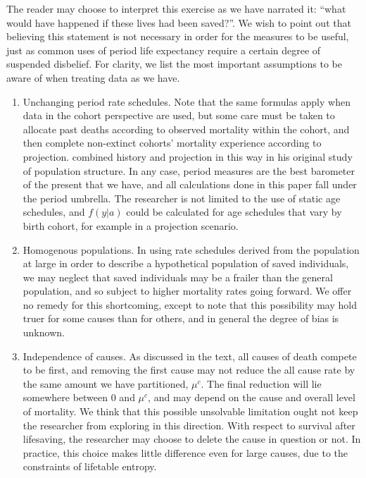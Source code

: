 \documentclass{article}
\begin{document}
The reader may choose to interpret this exercise as we
have narrated it: ``what would have happened if these lives had been saved?''. We wish to point out that believing
this statement is not necessary in order for the measures to be useful, just as common uses of
period life expectancy require a certain degree of suspended disbelief. For
clarity, we list the most important assumptions to be aware of when treating
data as we have.
\begin{enumerate}
\item Unchanging period rate schedules. Note that the same formulas apply when
data in the cohort perspective are used, but some care must be taken to allocate past deaths according to observed mortality within the cohort, and then complete non-extinct
cohorts' mortality experience according to
projection. \citet{brouard1986structure} combined history and projection
in this way in his original study of population structure.  In any case, period measures are the best barometer of the
present that we have, and all calculations done in this paper fall under the
period umbrella. The researcher is not limited to the use of static age
schedules, and $f(y|a)$ could be calculated for age schedules that vary
by birth cohort, for example in a projection scenario.
\item Homogenous populations. In using rate schedules derived from the
population at large in order to describe a hypothetical population of saved
individuals, we may neglect that saved individuals may be a frailer than the
general population, and so subject to higher mortality rates going forward. We
offer no remedy for this shortcoming, except to note that this possibility may
hold truer for some causes than for others, and in general the degree of bias is
unknown.
\item Independence of causes. As discussed in the text, all causes of death
compete to be first, and removing the first cause may not reduce the all cause
rate by the same amount we have partitioned, $\mu^c$. The final reduction will
lie somewhere between 0 and $\mu^c$, and may depend on the cause and
overall level of mortality. We think that this possible unsolvable limitation
ought not keep the researcher from exploring in this direction. With respect to
survival after lifesaving, the researcher may choose to delete the cause in
question or not. In practice, this choice makes little difference even for
large causes, due to the constraints of lifetable entropy.
\end{enumerate}
\end{document}
